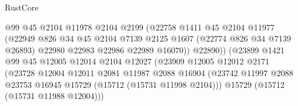 \begin{lexlean}{RustCore}
\begin{coremodule}
                                        @99
                                        @45
                                        @2104
                                        @11978
                                        @2104
                                        @2199
                                        (@22758
                                          @1411
                                          @45
                                          @2104
                                          @11977
                                          (@22949
                                            @826
                                            @34
                                            @45
                                            @2104
                                            @7139
                                            @2125
                                            @1607
                                            (@22774 @826 @34 @7139 @26893)
                                            @22980
                                            @22983
                                            @22986
                                            @22989
                                            @16070))
                                        @22890))
                                    (@23899
                                      @1421
                                      @99
                                      @45
                                      @12005
                                      @12014
                                      @2104
                                      @12027
                                      (@23909
                                        @12005
                                        @12012
                                        @2171
                                        (@23728
                                          @12004
                                          @12011
                                          @2081
                                          @11987
                                          @2088
                                          @16904
                                          (@23742
                                            @11997
                                            @2088
                                            @23753
                                            @16945
                                            @15729
                                            (@15712 (@15731 @11998 @2104)))
                                          @15729
                                          (@15712 (@15731 @11988 @12004)))

\end{coremodule}
\end{lexlean}
